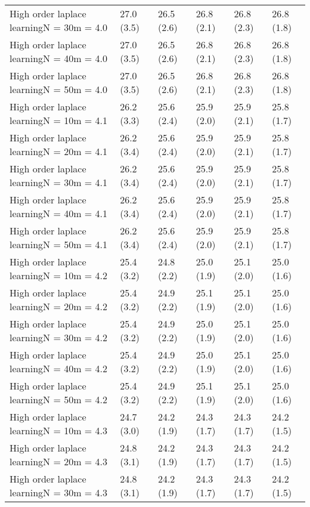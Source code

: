 \documentclass{article}
\begin{document}
\begin{table*}[t!]
\begin{center}
\begin{small}
\begin{sc}
\begin{tabular}{llllll}
High order laplace learningN = 30m = 4.0&27.0 (3.5)      &26.5 (2.6)      &26.8 (2.1)      &26.8 (2.3)      &26.8 (1.8)      \\
High order laplace learningN = 40m = 4.0&27.0 (3.5)      &26.5 (2.6)      &26.8 (2.1)      &26.8 (2.3)      &26.8 (1.8)      \\
High order laplace learningN = 50m = 4.0&27.0 (3.5)      &26.5 (2.6)      &26.8 (2.1)      &26.8 (2.3)      &26.8 (1.8)      \\
High order laplace learningN = 10m = 4.1&26.2 (3.3)      &25.6 (2.4)      &25.9 (2.0)      &25.9 (2.1)      &25.8 (1.7)      \\
High order laplace learningN = 20m = 4.1&26.2 (3.4)      &25.6 (2.4)      &25.9 (2.0)      &25.9 (2.1)      &25.8 (1.7)      \\
High order laplace learningN = 30m = 4.1&26.2 (3.4)      &25.6 (2.4)      &25.9 (2.0)      &25.9 (2.1)      &25.8 (1.7)      \\
High order laplace learningN = 40m = 4.1&26.2 (3.4)      &25.6 (2.4)      &25.9 (2.0)      &25.9 (2.1)      &25.8 (1.7)      \\
High order laplace learningN = 50m = 4.1&26.2 (3.4)      &25.6 (2.4)      &25.9 (2.0)      &25.9 (2.1)      &25.8 (1.7)      \\
High order laplace learningN = 10m = 4.2&25.4 (3.2)      &24.8 (2.2)      &25.0 (1.9)      &25.1 (2.0)      &25.0 (1.6)      \\
High order laplace learningN = 20m = 4.2&25.4 (3.2)      &24.9 (2.2)      &25.1 (1.9)      &25.1 (2.0)      &25.0 (1.6)      \\
High order laplace learningN = 30m = 4.2&25.4 (3.2)      &24.9 (2.2)      &25.0 (1.9)      &25.1 (2.0)      &25.0 (1.6)      \\
High order laplace learningN = 40m = 4.2&25.4 (3.2)      &24.9 (2.2)      &25.0 (1.9)      &25.1 (2.0)      &25.0 (1.6)      \\
High order laplace learningN = 50m = 4.2&25.4 (3.2)      &24.9 (2.2)      &25.1 (1.9)      &25.1 (2.0)      &25.0 (1.6)      \\
High order laplace learningN = 10m = 4.3&24.7 (3.0)      &24.2 (1.9)      &24.3 (1.7)      &24.3 (1.7)      &24.2 (1.5)      \\
High order laplace learningN = 20m = 4.3&24.8 (3.1)      &24.2 (1.9)      &24.3 (1.7)      &24.3 (1.7)      &24.2 (1.5)      \\
High order laplace learningN = 30m = 4.3&24.8 (3.1)      &24.2 (1.9)      &24.3 (1.7)      &24.3 (1.7)      &24.2 (1.5)      \\

\end{tabular}
\end{sc}
\end{small}
\end{center}
\end{table*}
\end{document}
